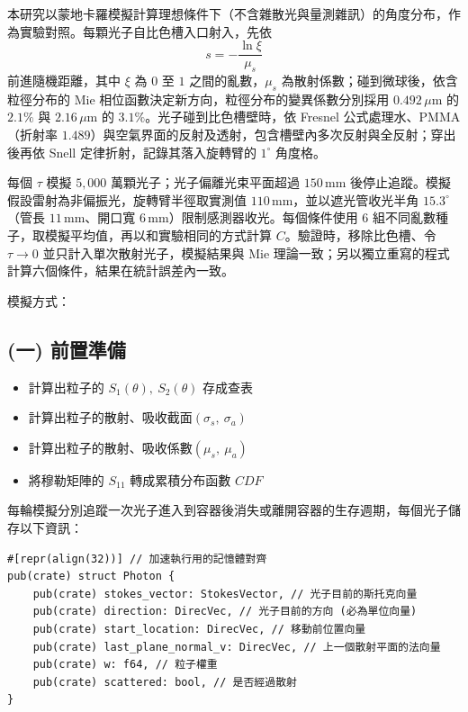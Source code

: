 
本研究以蒙地卡羅模擬計算理想條件下（不含雜散光與量測雜訊）的角度分布，作為實驗對照。每顆光子自比色槽入口射入，先依
\[
s=-\frac{\ln\xi}{\mu_s}
\]
前進隨機距離，其中 $\xi$ 為 $0$ 至 $1$ 之間的亂數，$\mu_s$ 為散射係數；碰到微球後，依含粒徑分布的 Mie 相位函數決定新方向，粒徑分布的變異係數分別採用 $0.492\,\mu\mathrm{m}$ 的 $2.1\%$ 與 $2.16\,\mu\mathrm{m}$ 的 $3.1\%$。光子碰到比色槽壁時，依 Fresnel 公式處理水、PMMA（折射率 $1.489$）與空氣界面的反射及透射，包含槽壁內多次反射與全反射；穿出後再依 Snell 定律折射，記錄其落入旋轉臂的 $1^\circ$ 角度格。

每個 $\tau$ 模擬 $5{,}000$ 萬顆光子；光子偏離光束平面超過 $150\,\mathrm{mm}$ 後停止追蹤。模擬假設雷射為非偏振光，旋轉臂半徑取實測值 $110\,\mathrm{mm}$，並以遮光管收光半角 $15.3^\circ$（管長 $11\,\mathrm{mm}$、開口寬 $6\,\mathrm{mm}$）限制感測器收光。每個條件使用 $6$ 組不同亂數種子，取模擬平均值，再以和實驗相同的方式計算 $C$。驗證時，移除比色槽、令 $\tau\to0$ 並只計入單次散射光子，模擬結果與 Mie 理論一致；另以獨立重寫的程式計算六個條件，結果在統計誤差內一致。

模擬方式：
\subsection*{(一) 前置準備}
\begin{itemize}
    \item[1.] 計算出粒子的 $S_1(\theta),\ S_2(\theta)$ 存成查表
    \item[2.] 計算出粒子的散射、吸收截面$\left(\sigma_s,\ \sigma_a\right)$
    \item[3.] 計算出粒子的散射、吸收係數$\left(\mu_s,\ \mu_a\right)$
    \item[4.] 將穆勒矩陣的 $S_{11}$ 轉成累積分布函數 $CDF$ 
\end{itemize}

每輪模擬分別追蹤一次光子進入到容器後消失或離開容器的生存週期，每個光子儲存以下資訊：
\begin{verbatim}
#[repr(align(32))] // 加速執行用的記憶體對齊
pub(crate) struct Photon {
    pub(crate) stokes_vector: StokesVector, // 光子目前的斯托克向量
    pub(crate) direction: DirecVec, // 光子目前的方向 (必為單位向量)
    pub(crate) start_location: DirecVec, // 移動前位置向量
    pub(crate) last_plane_normal_v: DirecVec, // 上一個散射平面的法向量
    pub(crate) w: f64, // 粒子權重
    pub(crate) scattered: bool, // 是否經過散射
}
\end{verbatim}

